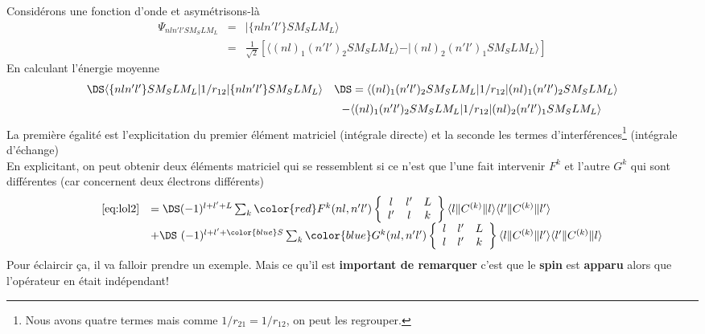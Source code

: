 Considérons une fonction d'onde et asymétrisons-là
\begin{eqnarray}
\Psi_{nl n'l' SM_S LM_L } & = & \vert \{  nl n'l' \} SM_S LM_L \rangle \nonumber \\
& = & \frac{1}{\sqrt{2}} \left[
\langle (nl)_1 (n'l')_2 SM_S LM_L \rangle - \vert (nl)_2 (n'l')_1 SM_S LM_L \rangle \right]
\end{eqnarray}
En calculant l'énergie moyenne
\begin{equation}
\begin{array}{ll}
\DS \langle  \{  nl n'l' \} SM_S LM_L \vert 1/r_{12} 
\vert  \{  nl n'l' \} SM_S LM_L  \rangle&\DS =  \langle (nl)_1 (n'l')_2 SM_S LM_L 
 \vert 1/r_{12} \vert (nl)_1 (n'l')_2 SM_S LM_L \rangle\vspace{2mm}\\
 &\ \ - \langle (nl)_1 (n'l')_2 SM_S LM_L  \vert 1/r_{12} 
\vert (nl)_2 (n'l')_1 SM_S LM_L \rangle
\end{array}
\label{eq:lol2}
\end{equation}
La première égalité est l'explicitation du premier élément matriciel (intégrale directe) et la seconde les termes d'interférences\footnote{Nous avons quatre termes mais comme $1/r_{21}=1/r_{12}$, on peut les 
regrouper.} (intégrale d'échange)\ \\

En explicitant, on peut obtenir deux éléments matriciel qui se ressemblent si ce n'est que l'une
fait intervenir $F^k$ et l'autre $G^k$ qui sont différentes (car concernent deux électrons 
différents)
\begin{equation}
\begin{array}{ll}
\eqref{eq:lol2} &=\DS (-1)^{l + l' + L } \sum_k 
{\color{red} F^k(nl,n'l') } \left\{ \begin{array}{ccc} l & l' & L \\ l' & l &k \end{array} \right\} 
            \langle l \Vert C^{(k)} \Vert l \rangle  \langle l' \Vert C^{(k)} \Vert l' \rangle\\
&+\DS\ (-1)^{l + l' + 
{\color{blue} S} } \sum_k 
{\color{blue} G^k(nl,n'l') } \left\{ \begin{array}{ccc} l & l' & L \\ l & l' &k \end{array} \right\} 
            \langle l \Vert C^{(k)} \Vert l' \rangle  \langle l' \Vert C^{(k)} \Vert l \rangle            
\end{array}
\label{eq:lol3}
\end{equation}
Pour éclaircir ça, il va falloir prendre un exemple. Mais ce qu'il est \textbf{important de 
remarquer} c'est que le \textbf{spin} est \textbf{apparu} alors que l'opérateur en était
indépendant! \\

